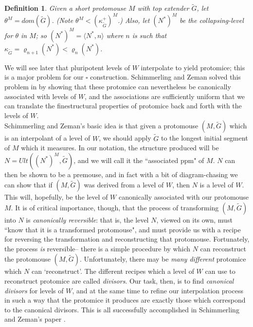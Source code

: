 \documentclass[12pt]{article}
\newtheorem{defn}[thm]{Definition}
\begin{document}
\begin{defn} \label{theta of short protomouse}
Given a short protomouse $M$ with top extender $\tilde{G}$, let $\theta^M = dom(\tilde{G})$.  (Note $\theta^M < (  \kappa_{\tilde{G}}^+ )^M$.)  Also, let $(N^* )^M$ be the collapsing-level for $\theta$ in $M$; so $(N^*)^M = \langle N^* , n \rangle$ where $n$ is such that $\kappa_{\tilde{G}} = \varrho_{n+1} ( N^* ) < \varrho_n (N^* )$.
\end{defn}


We will see later that pluripotent levels of $W$ interpolate to yield protomice; this is a major problem for our $\square$ construction.  Schimmerling and Zeman solved this problem in \cite{zeman square proof} by showing that these protomice can nevertheless be canonically associated with levels of $W$, and the associations are sufficiently uniform that we can translate the finestructural properties of protomice back and forth with the levels of $W$.\\

Schimmerling and Zeman's basic idea is that given a protomouse $(M, \tilde{G})$ which is an interpolant of a level of $W$, we should apply $\tilde{G}$ to the longest initial segment of $M$ which it measures.  In our notation, the structure produced will be $N = Ult((N^*)^M , \tilde{G})$, and we will call it the ``associated ppm" of $M$.  $N$ can then be shown to be a premouse, and in fact with a bit of diagram-chasing we can show that if $(M, \tilde{G})$ was derived from a level of $W$, then $N$ is a level of $W$.  This will, hopefully, be the level of $W$ canonically associated with our protomouse $M$.  It is of critical importance, though, that the process of transforming $(M , \tilde{G})$ into $N$ is \textit{canonically reversible}: that is, the level $N$, viewed on its own, must ``know that it is a transformed protomouse", and must provide us with a recipe for reversing the transformation and reconstructing that protomouse.  Fortunately, the process \textit{is} reversible-- there is a simple procedure by which $N$ can reconstruct the protomouse $(M , \tilde{G})$.  Unfortunately, there may be \textit{many different} protomice which $N$ can `reconstruct'.  The different recipes which a level of $W$ can use to reconstruct protomice are called \textit{divisors}.  Our task, then, is to find \textit{canonical divisors} for levels of $W$, and at the same time to refine our interpolation process in such a way that the protomice it produces are exactly those which correspond to the canonical divisors.  This is all successfully accomplished in Schimmerling and Zeman's paper \cite{zeman square proof}.\\
\end{document}
